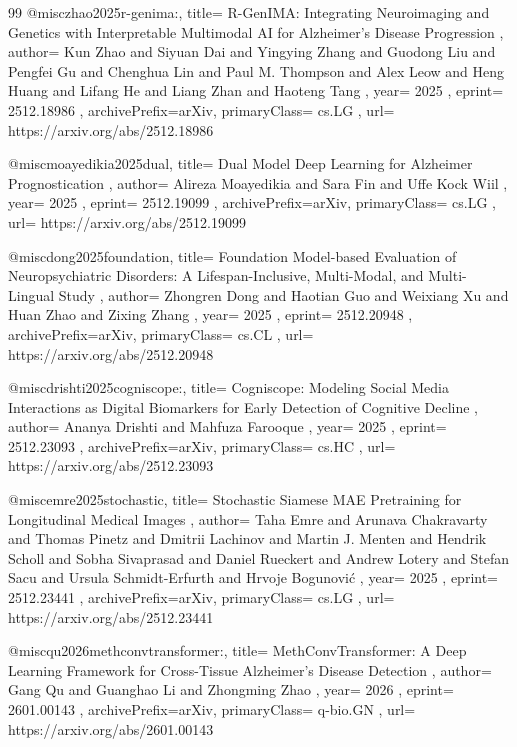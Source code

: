 \documentclass[11pt,a4paper]{article}
\begin{document}
\begin{thebibliography}{99}
@misc{zhao2025r-genima:,
  title={ R-GenIMA: Integrating Neuroimaging and Genetics with Interpretable Multimodal AI for Alzheimer's Disease Progression },
  author={ Kun Zhao and Siyuan Dai and Yingying Zhang and Guodong Liu and Pengfei Gu and Chenghua Lin and Paul M. Thompson and Alex Leow and Heng Huang and Lifang He and Liang Zhan and Haoteng Tang },
  year={ 2025 },
  eprint={ 2512.18986 },
  archivePrefix={arXiv},
  primaryClass={ cs.LG },
  url={ https://arxiv.org/abs/2512.18986 }
}


@misc{moayedikia2025dual,
  title={ Dual Model Deep Learning for Alzheimer Prognostication },
  author={ Alireza Moayedikia and Sara Fin and Uffe Kock Wiil },
  year={ 2025 },
  eprint={ 2512.19099 },
  archivePrefix={arXiv},
  primaryClass={ cs.LG },
  url={ https://arxiv.org/abs/2512.19099 }
}


@misc{dong2025foundation,
  title={ Foundation Model-based Evaluation of Neuropsychiatric Disorders: A Lifespan-Inclusive, Multi-Modal, and Multi-Lingual Study },
  author={ Zhongren Dong and Haotian Guo and Weixiang Xu and Huan Zhao and Zixing Zhang },
  year={ 2025 },
  eprint={ 2512.20948 },
  archivePrefix={arXiv},
  primaryClass={ cs.CL },
  url={ https://arxiv.org/abs/2512.20948 }
}


@misc{drishti2025cogniscope:,
  title={ Cogniscope: Modeling Social Media Interactions as Digital Biomarkers for Early Detection of Cognitive Decline },
  author={ Ananya Drishti and Mahfuza Farooque },
  year={ 2025 },
  eprint={ 2512.23093 },
  archivePrefix={arXiv},
  primaryClass={ cs.HC },
  url={ https://arxiv.org/abs/2512.23093 }
}


@misc{emre2025stochastic,
  title={ Stochastic Siamese MAE Pretraining for Longitudinal Medical Images },
  author={ Taha Emre and Arunava Chakravarty and Thomas Pinetz and Dmitrii Lachinov and Martin J. Menten and Hendrik Scholl and Sobha Sivaprasad and Daniel Rueckert and Andrew Lotery and Stefan Sacu and Ursula Schmidt-Erfurth and Hrvoje Bogunović },
  year={ 2025 },
  eprint={ 2512.23441 },
  archivePrefix={arXiv},
  primaryClass={ cs.LG },
  url={ https://arxiv.org/abs/2512.23441 }
}


@misc{qu2026methconvtransformer:,
  title={ MethConvTransformer: A Deep Learning Framework for Cross-Tissue Alzheimer's Disease Detection },
  author={ Gang Qu and Guanghao Li and Zhongming Zhao },
  year={ 2026 },
  eprint={ 2601.00143 },
  archivePrefix={arXiv},
  primaryClass={ q-bio.GN },
  url={ https://arxiv.org/abs/2601.00143 }
}


\end{thebibliography}
\end{document}
